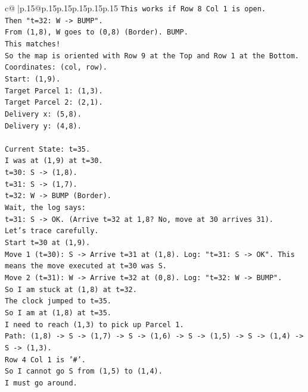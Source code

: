 \documentclass{article}
\begin{document}
{\begin{supertabular}{c@{$\;$}|p{.15\linewidth}@{}p{.15\linewidth}p{.15\linewidth}p{.15\linewidth}p{.15\linewidth}p{.15\linewidth}}
{{{\texttt{This works if Row 8 Col 1 is open.} \\
\texttt{Then "t=32: W {-}> BUMP".} \\
\texttt{From (1,8), W goes to (0,8) (Border). BUMP.} \\
\texttt{This matches!} \\
\texttt{So the map is oriented with Row 9 at the Top and Row 1 at the Bottom.} \\
\texttt{Coordinates: (col, row).} \\
\texttt{Start: (1,9).} \\
\texttt{Target Parcel 1: (1,3).} \\
\texttt{Target Parcel 2: (2,1).} \\
\texttt{Delivery x: (5,8).} \\
\texttt{Delivery y: (4,8).} \\
\\ 
\texttt{Current State: t=35.} \\
\texttt{I was at (1,9) at t=30.} \\
\texttt{t=30: S {-}> (1,8).} \\
\texttt{t=31: S {-}> (1,7).} \\
\texttt{t=32: W {-}> BUMP (Border).} \\
\texttt{Wait, the log says:} \\
\texttt{t=31: S {-}> OK. (Arrive t=32 at 1,8? No, move at 30 arrives 31).} \\
\texttt{Let's trace carefully.} \\
\texttt{Start t=30 at (1,9).} \\
\texttt{Move 1 (t=30): S {-}> Arrive t=31 at (1,8). Log: "t=31: S {-}> OK". This means the move executed at t=30 was S.} \\
\texttt{Move 2 (t=31): W {-}> Arrive t=32 at (0,8). Log: "t=32: W {-}> BUMP".} \\
\texttt{So I am stuck at (1,8) at t=32.} \\
\texttt{The clock jumped to t=35.} \\
\texttt{So I am at (1,8) at t=35.} \\
\texttt{I need to reach (1,3) to pick up Parcel 1.} \\
\texttt{Path: (1,8) {-}> S {-}> (1,7) {-}> S {-}> (1,6) {-}> S {-}> (1,5) {-}> S {-}> (1,4) {-}> S {-}> (1,3).} \\
\texttt{Row 4 Col 1 is '\#'.} \\
\texttt{So I cannot go S from (1,5) to (1,4).} \\
\texttt{I must go around.} \\
}}}
\end{supertabular}}
\end{document}
